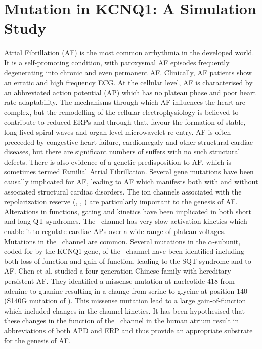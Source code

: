 \section{Mutation in KCNQ1: A Simulation Study}

Atrial Fibrillation (AF) is the most common arrhythmia in the developed world.
It is a self-promoting condition, with paroxysmal AF episodes frequently
degenerating into chronic and even permanent AF.
Clinically, AF patients show an erratic and high frequency ECG.
At the cellular level, AF is characterised by an abbreviated action potential
(AP) which has no plateau phase and poor heart rate adaptability.
The mechanisms through which AF influences the heart are complex, but the
remodelling of the cellular electrophysiology is believed to contribute to
reduced ERPs and through that, favour the formation of stable, long lived
spiral waves and organ level microwavelet re-entry.
AF is often preceeded by congestive heart failure, cardiomegaly and other
structural cardiac diseases, but there are significant numbers of suffers with
no such structural defects.
There is also evidence of a genetic predisposition to AF, which is sometimes
termed Familial Atrial Fibrillation.
Several gene mutations have been causally implicated for AF, leading to AF
which manifests both with and without associated structural cardiac disorders.
The ion channels associated with the repolarization reserve (, ,
) are particularly important to the genesis of AF.
Alterations in functions, gating and kinetics have been implicated in both short
and long QT syndromes.
The \ channel has very slow activation kinetics which enable it to
regulate cardiac APs over a wide range of plateau voltages.
Mutations in the \ channel are common.
Several mutations in the $\alpha$-subunit, coded for by the KCNQ1 gene, of the
\ channel have been identified including both loss-of-function and
gain-of-function, leading to the SQT syndrome and to AF.
Chen et al. studied a four generation Chinese family with hereditary persistent
AF.
They identified a missense mutation at nucleotide 418 from adenine to guanine
resulting in a change from serine to glycine at position 140 (S140G mutation of
).
This missense mutation lead to a large gain-of-function which included changes
in the channel kinetics.
It has been hypothesised that these changes in the function of the \
channel in the human atrium result in abbreviations of both APD and ERP and thus
provide an appropriate substrate for the genesis of AF.


